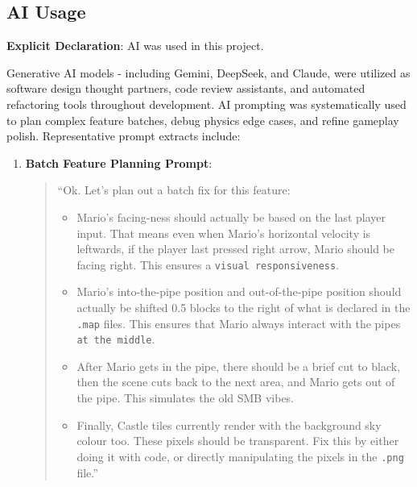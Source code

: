 \documentclass[12pt, a4paper]{article}
\begin{document}
\newpage

\subsection{AI Usage}

\textbf{Explicit Declaration}: AI was used in this project.

Generative AI models - including Gemini, DeepSeek, and Claude, were utilized as software design thought partners, code review assistants, and automated refactoring tools throughout development. AI prompting was systematically used to plan complex feature batches, debug physics edge cases, and refine gameplay polish. Representative prompt extracts include:

\begin{enumerate}
\item \textbf{Batch Feature Planning Prompt}:
\begin{quote}
``Ok. Let's plan out a batch fix for this feature:
\begin{itemize}
\item Mario's facing-ness should actually be based on the last player input. That means even when Mario's horizontal velocity is leftwards, if the player last pressed right arrow, Mario should be facing right. This ensures a \texttt{visual responsiveness}.
\item Mario's into-the-pipe position and out-of-the-pipe position should actually be shifted 0.5 blocks to the right of what is declared in the \texttt{.map} files. This ensures that Mario always interact with the pipes \texttt{at the middle}.
\item After Mario gets in the pipe, there should be a brief cut to black, then the scene cuts back to the next area, and Mario gets out of the pipe. This simulates the old SMB vibes.
\item Finally, Castle tiles currently render with the background sky colour too. These pixels should be transparent. Fix this by either doing it with code, or directly manipulating the pixels in the \texttt{.png} file.''
\end{itemize}

\end{quote}


\end{enumerate}
\end{document}
